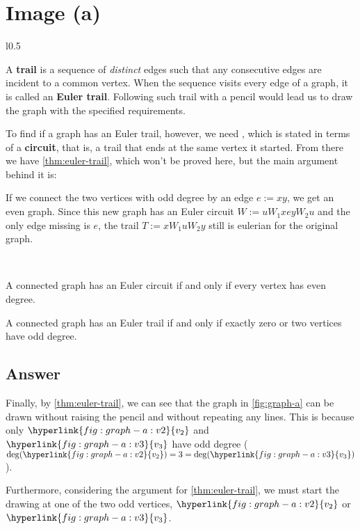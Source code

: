 \section{Image (a)}

\begin{wrapfigure}{l}{0.5\textwidth}
    \centering
    

    \caption{Image \texttt{a.} from question with labelled nodes.}
    \label{fig:graph-a}
\end{wrapfigure}

A \textbf{trail} is a sequence of \textit{distinct} edges such that any consecutive edges are incident to a common vertex. When the sequence visits every edge of a graph, it is called an \textbf{Euler trail}. Following such trail with a pencil would lead us to draw the graph with the specified requirements.

To find if a graph has an Euler trail, however, we need , which is stated in terms of a \textbf{circuit}, that is, a trail that ends at the same vertex it started. From there we have \cref{thm:euler-trail}, which won't be proved here, but the main argument behind it is:

If we connect the two vertices with odd degree by an edge $e := x y$, we get an even graph. Since this new graph has an Euler circuit $W := u W_1 x e y W_2 u$ and the only edge missing is $e$, the trail $T := x W_1 u W_2 y$ still is eulerian for the original graph.

~

\begin{theorem} \label{thm:euler-circuit}
    A connected graph has an Euler circuit if and only if every vertex has even degree.
\end{theorem}

\begin{proposition} \label{thm:euler-trail}
    A connected graph has an Euler trail if and only if exactly zero or two vertices have odd degree.
\end{proposition}

\subsection{Answer} \label{sec:graph-a}

    Finally, by \cref{thm:euler-trail}, we can see that the graph in \cref{fig:graph-a} can be drawn without raising the pencil and without repeating any lines. This is because only $\hyperlink{fig:graph-a:v2}{v_2}$ and $\hyperlink{fig:graph-a:v3}{v_3}$ have odd degree ($\deg(\hyperlink{fig:graph-a:v2}{v_2}) = 3 = \deg(\hyperlink{fig:graph-a:v3}{v_3})$).

    Furthermore, considering the argument for \cref{thm:euler-trail}, we must start the drawing at one of the two odd vertices, $\hyperlink{fig:graph-a:v2}{v_2}$ or $\hyperlink{fig:graph-a:v3}{v_3}$.

